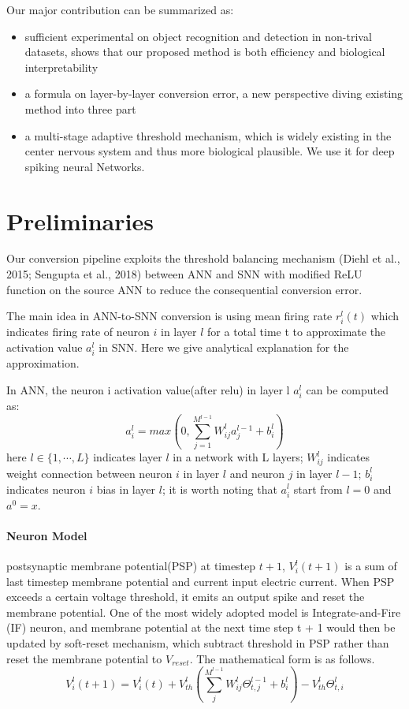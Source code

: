 \documentclass{article}
\begin{document}
Our major contribution can be summarized as:
\begin{itemize}
  \item sufficient experimental on object recognition and detection in non-trival datasets, shows that our proposed method is both efficiency and biological interpretability
  \item a formula on layer-by-layer conversion error, a new perspective diving existing method into three part 
  \item a multi-stage adaptive threshold mechanism, which is widely existing in the center nervous system and thus more biological plausible. We use it for deep spiking neural Networks.
\end{itemize}


\section{Preliminaries}
Our conversion pipeline exploits the threshold balancing mechanism (Diehl et al., 2015; Sengupta
et al., 2018) between ANN and SNN with modified ReLU function on the source ANN to reduce
the consequential conversion error. 

The main idea in ANN-to-SNN conversion is using mean firing rate $r_i^l(t)$ which indicates firing rate of neuron $i$ in layer $l$ for a total time t to approximate the activation value $a_i^l$ in SNN.
Here we give analytical explanation for the approximation.

In ANN, the neuron i activation value(after relu) in layer l $a_i^l$ can be computed as:
\begin{equation}
  a_i^l = max\left(0, \sum_{j=1}^{M^{l-1}}W_{ij}^la_j^{l-1} + b_i^l\right)
\end{equation}
here $l \in \{1, \cdots ,L\}$ indicates layer $l$ in a network with L layers; $W_{ij}^l$ indicates weight connection between neuron $i$ in layer $l$ and neuron $j$ in layer $l-1$;
$b_i^l$ indicates neuron $i$ bias in layer $l$; it is worth noting that $a_i^l$ start from $l=0$ and $a^0=x$.


\paragraph{Neuron Model} postsynaptic membrane potential(PSP) at timestep $t+1$, $V_i^l(t+1)$ is a sum of last timestep membrane potential and current input electric current. When PSP exceeds a certain voltage threshold, it emits an output spike and reset the membrane potential.
One of the most widely adopted model is Integrate-and-Fire (IF) neuron, and membrane potential at the next time
step t + 1 would then be updated by soft-reset mechanism, which subtract threshold in PSP rather than reset the membrane potential to $V_{reset}$. The mathematical form is as follows.
\begin{equation}
V_i^l(t + 1)=V_{i}^{l}(t)+V_{th}^l\left(\sum_j^{M^{l-1}}W_{ij}^l\Theta_{t,j}^{l-1}+b_i^l\right)-V_{th}^l\Theta_{t,i}^{l}
\end{equation}
\end{document}
